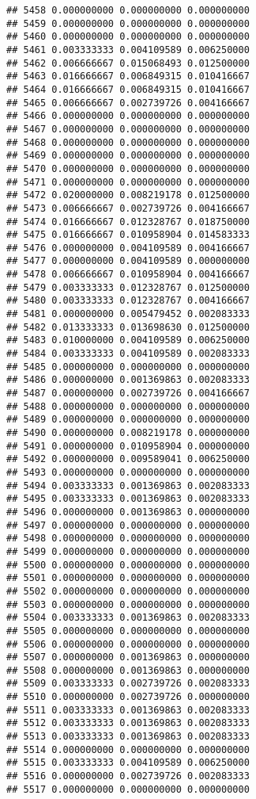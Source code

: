\documentclass[
]{article}
\begin{document}
\begin{verbatim}
## 5458 0.000000000 0.000000000 0.000000000
## 5459 0.000000000 0.000000000 0.000000000
## 5460 0.000000000 0.000000000 0.000000000
## 5461 0.003333333 0.004109589 0.006250000
## 5462 0.006666667 0.015068493 0.012500000
## 5463 0.016666667 0.006849315 0.010416667
## 5464 0.016666667 0.006849315 0.010416667
## 5465 0.006666667 0.002739726 0.004166667
## 5466 0.000000000 0.000000000 0.000000000
## 5467 0.000000000 0.000000000 0.000000000
## 5468 0.000000000 0.000000000 0.000000000
## 5469 0.000000000 0.000000000 0.000000000
## 5470 0.000000000 0.000000000 0.000000000
## 5471 0.000000000 0.000000000 0.000000000
## 5472 0.020000000 0.008219178 0.012500000
## 5473 0.006666667 0.002739726 0.004166667
## 5474 0.016666667 0.012328767 0.018750000
## 5475 0.016666667 0.010958904 0.014583333
## 5476 0.000000000 0.004109589 0.004166667
## 5477 0.000000000 0.004109589 0.000000000
## 5478 0.006666667 0.010958904 0.004166667
## 5479 0.003333333 0.012328767 0.012500000
## 5480 0.003333333 0.012328767 0.004166667
## 5481 0.000000000 0.005479452 0.002083333
## 5482 0.013333333 0.013698630 0.012500000
## 5483 0.010000000 0.004109589 0.006250000
## 5484 0.003333333 0.004109589 0.002083333
## 5485 0.000000000 0.000000000 0.000000000
## 5486 0.000000000 0.001369863 0.002083333
## 5487 0.000000000 0.002739726 0.004166667
## 5488 0.000000000 0.000000000 0.000000000
## 5489 0.000000000 0.000000000 0.000000000
## 5490 0.000000000 0.008219178 0.000000000
## 5491 0.000000000 0.010958904 0.000000000
## 5492 0.000000000 0.009589041 0.006250000
## 5493 0.000000000 0.000000000 0.000000000
## 5494 0.003333333 0.001369863 0.002083333
## 5495 0.003333333 0.001369863 0.002083333
## 5496 0.000000000 0.001369863 0.000000000
## 5497 0.000000000 0.000000000 0.000000000
## 5498 0.000000000 0.000000000 0.000000000
## 5499 0.000000000 0.000000000 0.000000000
## 5500 0.000000000 0.000000000 0.000000000
## 5501 0.000000000 0.000000000 0.000000000
## 5502 0.000000000 0.000000000 0.000000000
## 5503 0.000000000 0.000000000 0.000000000
## 5504 0.003333333 0.001369863 0.002083333
## 5505 0.000000000 0.000000000 0.000000000
## 5506 0.000000000 0.000000000 0.000000000
## 5507 0.000000000 0.001369863 0.000000000
## 5508 0.000000000 0.001369863 0.000000000
## 5509 0.003333333 0.002739726 0.002083333
## 5510 0.000000000 0.002739726 0.000000000
## 5511 0.003333333 0.001369863 0.002083333
## 5512 0.003333333 0.001369863 0.002083333
## 5513 0.003333333 0.001369863 0.002083333
## 5514 0.000000000 0.000000000 0.000000000
## 5515 0.003333333 0.004109589 0.006250000
## 5516 0.000000000 0.002739726 0.002083333
## 5517 0.000000000 0.000000000 0.000000000

\end{verbatim}
\end{document}
